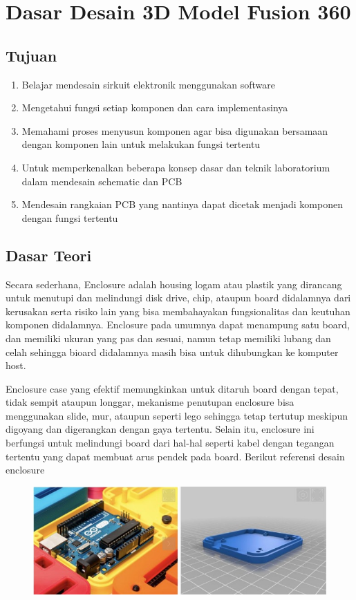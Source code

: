 \chapter{Dasar Desain 3D Model Fusion 360}

\section{Tujuan}
\begin{enumerate}
    \item Belajar mendesain sirkuit elektronik menggunakan software
    \item Mengetahui fungsi setiap komponen dan cara implementasinya
    \item Memahami proses menyusun komponen agar bisa digunakan bersamaan dengan komponen lain
    untuk melakukan fungsi tertentu
    \item Untuk memperkenalkan beberapa konsep dasar dan teknik laboratorium dalam mendesain
    schematic dan PCB
    \item Mendesain rangkaian PCB yang nantinya dapat dicetak menjadi komponen dengan fungsi
    tertentu
\end{enumerate}

\section{Dasar Teori}
Secara sederhana, Enclosure adalah housing logam atau plastik yang dirancang untuk menutupi dan
melindungi disk drive, chip, ataupun board didalamnya dari kerusakan serta risiko lain yang bisa
membahayakan fungsionalitas dan keutuhan komponen didalamnya. Enclosure pada umumnya dapat
menampung satu board, dan memiliki ukuran yang pas dan sesuai, namun tetap memiliki lubang dan celah
sehingga bioard didalamnya masih bisa untuk dihubungkan ke komputer host.

Enclosure case yang efektif memungkinkan untuk ditaruh board dengan tepat, tidak sempit ataupun
longgar, mekanisme penutupan enclosure bisa menggunakan slide, mur, ataupun seperti lego sehingga
tetap tertutup meskipun digoyang dan digerangkan dengan gaya tertentu. Selain itu, enclosure ini
berfungsi untuk melindungi board dari hal-hal seperti kabel dengan tegangan tertentu yang dapat
membuat arus pendek pada board. Berikut referensi desain enclosure

    \begin{figure}[H]
        \centering
        \includegraphics[width=1\linewidth]{P3/img/image1.jpg}
        
    \end{figure}

